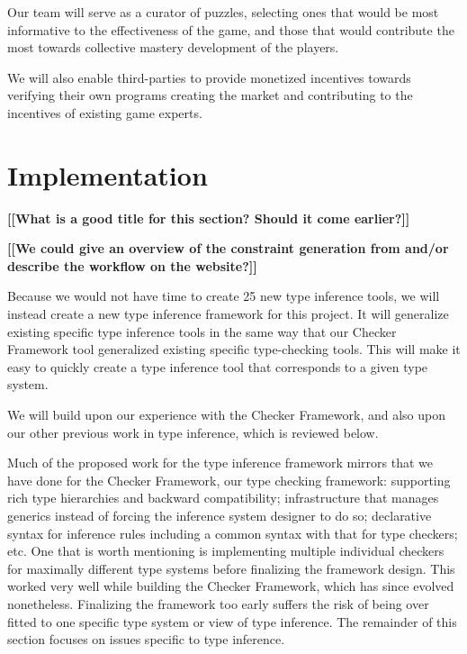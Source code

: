 \documentclass[preprint]{sig-alternate}
\newcommand{\todo}[1]{{\color{red}\bfseries [[#1]]}}
\begin{document}
Our team will serve as a curator of puzzles, selecting ones that would
be most informative to the effectiveness of the game, and those that
would contribute the most towards collective mastery development of
the players.

We will also enable third-parties to provide monetized incentives
towards verifying their own programs creating the market and
contributing to the incentives of existing game experts.


\section{Implementation}
\label{sec:impl}

\todo{What is a good title for this section? Should it come earlier?}

\todo{We could give an overview of the constraint generation from
  \cite{DietlEM2011} and/or describe the workflow on the website?}


Because we would not have time to create 25 new type inference tools, we
will instead create a new type inference framework for this project.  It
will generalize existing specific type inference tools in the same way that
our Checker Framework tool generalized existing specific type-checking
tools.  This will make it easy to quickly create a type inference tool that
corresponds to a given type system.

We will build upon our experience with the Checker Framework, and also
upon our other previous work in type inference, which is reviewed
below.

Much of the proposed work for the type inference framework mirrors
that we have done for the Checker Framework, our type checking
framework: supporting rich type hierarchies and backward
compatibility; infrastructure that manages generics instead of forcing
the inference system designer to do so; declarative syntax for
inference rules including a common syntax with that for type checkers;
etc.  One that is worth mentioning is implementing multiple individual
checkers for maximally different type systems before finalizing the
framework design.  This worked very well while building the Checker
Framework, which has since evolved nonetheless.  Finalizing the
framework too early suffers the risk of being over fitted to one
specific type system or view of type inference.  The remainder of this
section focuses on issues specific to type inference.
\end{document}
